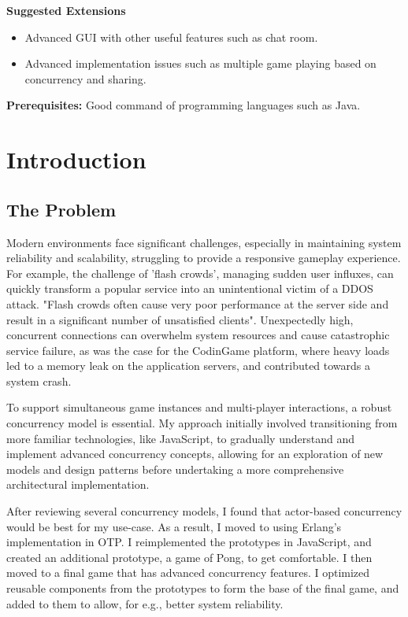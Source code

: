 \documentclass[]{final}
\begin{document}
\textbf{Suggested Extensions}
\begin{itemize}
  \item Advanced GUI with other useful features such as chat room.
  \item Advanced implementation issues such as multiple game playing based on concurrency and sharing.
\end{itemize}

\textbf{Prerequisites:} Good command of programming languages such as Java.


\chapter{Introduction}
\section{The Problem}

\label{rationale_problem}

Modern environments face significant challenges, especially in maintaining
system reliability and scalability, struggling to provide a responsive gameplay
experience. For example, the challenge of 'flash crowds', managing sudden user influxes,
can quickly transform a popular service into an unintentional victim of a
DDOS attack. "Flash crowds often cause very poor performance
at the server side and result in a significant number of unsatisfied
clients"\cite{Ari_crss_nodate}. Unexpectedly high, concurrent connections can overwhelm
system resources and cause catastrophic service failure, as was the case for
the CodinGame platform, where heavy loads led to a memory leak on the application
servers, and contributed towards a system crash\cite{jobert_story_2017}.

To support simultaneous game instances and multi-player interactions,
a robust concurrency model is essential. My approach initially involved
transitioning from more familiar technologies, like JavaScript, to
gradually understand and implement advanced concurrency concepts,
allowing for an exploration of new models and design patterns before
undertaking a more comprehensive architectural implementation.

After reviewing several concurrency models,
I found that actor-based concurrency would be best for my use-case.
As a result, I moved to using Erlang's implementation in OTP.
I reimplemented the prototypes in JavaScript, and created an additional
prototype, a game of Pong, to get comfortable.
I then moved to a final game that has advanced concurrency
features. I optimized reusable components from the prototypes to form the
base of the final game, and added to them to allow, for e.g., better system
reliability.
\end{document}
